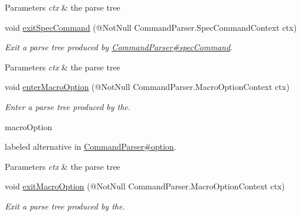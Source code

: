 \begin{DoxyCompactItemize}
\begin{DoxyCompactList}
\begin{DoxyParams}{Parameters}
{\em ctx} & the parse tree\\
\hline
\end{DoxyParams}
 \end{DoxyCompactList}\item 
void \hyperlink{classedu_1_1udel_1_1cis_1_1vsl_1_1civl_1_1run_1_1common_1_1CommandBaseListener_ab971bed8a2a5f6206ae9cc8e6512fd8a}{exit\+Spec\+Command} (@Not\+Null Command\+Parser.\+Spec\+Command\+Context ctx)
\begin{DoxyCompactList}\small\item\em Exit a parse tree produced by \hyperlink{}{Command\+Parser\#spec\+Command}.


\begin{DoxyParams}{Parameters}
{\em ctx} & the parse tree\\
\hline
\end{DoxyParams}
 \end{DoxyCompactList}\item 
void \hyperlink{classedu_1_1udel_1_1cis_1_1vsl_1_1civl_1_1run_1_1common_1_1CommandBaseListener_a9b85e2a09dac90af82241aadd458edce}{enter\+Macro\+Option} (@Not\+Null Command\+Parser.\+Macro\+Option\+Context ctx)
\begin{DoxyCompactList}\small\item\em Enter a parse tree produced by the.


\begin{DoxyCode}
macroOption 
\end{DoxyCode}
 labeled alternative in \hyperlink{}{Command\+Parser\#option}. 
\begin{DoxyParams}{Parameters}
{\em ctx} & the parse tree\\
\hline
\end{DoxyParams}
 \end{DoxyCompactList}\item 
void \hyperlink{classedu_1_1udel_1_1cis_1_1vsl_1_1civl_1_1run_1_1common_1_1CommandBaseListener_a738a1836074e4599e51e79e9c6e7664a}{exit\+Macro\+Option} (@Not\+Null Command\+Parser.\+Macro\+Option\+Context ctx)
\begin{DoxyCompactList}\small\item\em Exit a parse tree produced by the.



\end{DoxyCompactList}
\end{DoxyCompactItemize}

